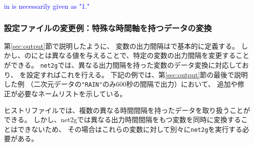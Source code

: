 \textcolor{blue}{ in  is necessarily given as "1."}



\subsubsection{設定ファイルの変更例：特殊な時間軸を持つデータの変換}

第\ref{sec:output}節で説明したように、
変数の出力間隔はで基本的に定義する。
しかし、のにとは異なる値を与えることで、特定の変数の出力間隔を変更することができる。
\verb|net2g|では、異なる出力間隔を持った変数のデータ変換に対応しており、
を設定すればこれを行える。
下記の例では、第\ref{sec:output}節の最後で説明した例
（二次元データの\verb|"RAIN"|のみ600秒の間隔で出力）において、
追加や修正が必要なネームリストを示している。

ヒストリファイルでは、複数の異なる時間間隔を持ったデータを取り扱うことができる。
しかし、net2gでは異なる出力時間間隔をもつ変数を同時に変換することはできないため、
その場合はこれらの変数に対して別々に\verb|net2g|を実行する必要がある。

